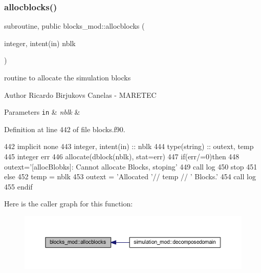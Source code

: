 \subsubsection{\texorpdfstring{allocblocks()}{allocblocks()}}
{\footnotesize\ttfamily subroutine, public blocks\+\_\+mod\+::allocblocks (\begin{DoxyParamCaption}\item[{integer, intent(in)}]{nblk }\end{DoxyParamCaption})}



routine to allocate the simulation blocks 

\begin{DoxyAuthor}{Author}
Ricardo Birjukovs Canelas -\/ M\+A\+R\+E\+T\+EC 
\end{DoxyAuthor}

\begin{DoxyParams}[1]{Parameters}
\mbox{\tt in}  & {\em nblk} & \\
\hline
\end{DoxyParams}


Definition at line 442 of file blocks.\+f90.


\begin{DoxyCode}
442     \textcolor{keywordtype}{implicit none}
443     \textcolor{keywordtype}{integer}, \textcolor{keywordtype}{intent(in)} ::  nblk
444     \textcolor{keywordtype}{type}(string) :: outext, temp
445     \textcolor{keywordtype}{integer} err
446     \textcolor{keyword}{allocate}(dblock(nblk), stat=err)
447     \textcolor{keywordflow}{if}(err/=0)\textcolor{keywordflow}{then}
448         outext=\textcolor{stringliteral}{'[allocBlobks]: Cannot allocate Blocks, stoping'}
449         \textcolor{keyword}{call }log%
450         stop
451     \textcolor{keywordflow}{else}
452         temp = nblk
453         outext = \textcolor{stringliteral}{'Allocated '}// temp // \textcolor{stringliteral}{' Blocks.'}
454         \textcolor{keyword}{call }log%
455 \textcolor{keywordflow}{    endif}
\end{DoxyCode}
Here is the caller graph for this function\+:\nopagebreak
\begin{figure}[H]
\begin{center}
\leavevmode
\includegraphics[width=350pt]{namespaceblocks__mod_a639beb0fee2290d46353f4b4702d6711_icgraph}
\end{center}
\end{figure}
\mbox{\label{namespaceblocks__mod_a27c7e788c5f3979bfe9d43aad138286a}} 
